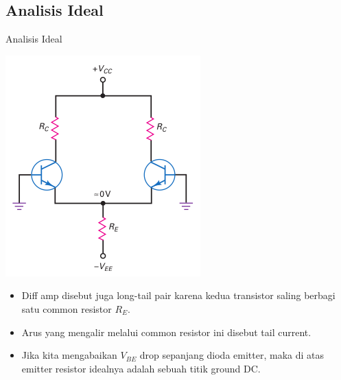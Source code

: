 \documentclass[aspectratio=169]{beamer}
\begin{document}
\subsection{Analisis Ideal}
\begin{frame}{Analisis Ideal}
	\begin{multicols}{2}
		\begin{center}
			\includegraphics[width=0.7\textheight]{gambar/01.diff-amp/01.ideal_dc_analysis}
		\end{center}
		\columnbreak
		\begin{itemize}
			\item Diff amp disebut juga long-tail pair karena kedua transistor saling berbagi satu common resistor $ R_E $.
			\item Arus yang mengalir melalui common resistor ini disebut tail current.
			\item Jika kita mengabaikan $ V_{BE} $ drop sepanjang dioda emitter, maka di atas emitter resistor idealnya adalah sebuah titik ground DC.
		\end{itemize}
		\vfill\null
	\end{multicols}
\end{frame}
\end{document}
